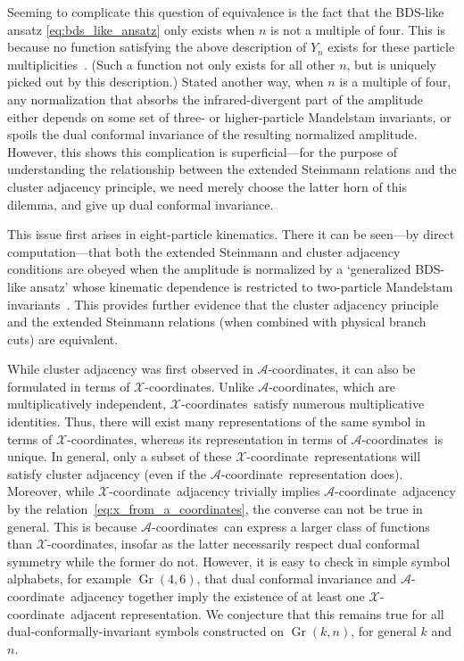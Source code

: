 \documentclass[12pt]{article}
\DeclareMathOperator{\Gr}{Gr}
\def\xcoord{$\mathcal{X}$-coordinate}
\def\xcoords{$\mathcal{X}$-coordinates}
\def\acoord{$\mathcal{A}$-coordinate}
\def\acoords{$\mathcal{A}$-coordinates}
\begin{document}
Seeming to complicate this question of equivalence is the fact that the BDS-like ansatz \eqref{eq:bds_like_ansatz} only exists when $n$ is not a multiple of four. This is because no function satisfying the above description of $Y_n$ exists for these particle multiplicities~\cite{Yang:2010az,Dixon:2016nkn}. (Such a function not only exists for all other $n$, but is uniquely picked out by this description.) Stated another way, when $n$ is a multiple of four, any normalization that absorbs the infrared-divergent part of the amplitude either depends on some set of three- or higher-particle Mandelstam invariants, or spoils the dual conformal invariance of the resulting normalized amplitude. However, this shows this complication is superficial---for the purpose of understanding the relationship between the extended Steinmann relations and the cluster adjacency principle, we need merely choose the latter horn of this dilemma, and give up dual conformal invariance. 

This issue first arises in eight-particle kinematics. There it can be seen---by direct computation---that both the extended Steinmann and cluster adjacency conditions are obeyed when the amplitude is normalized by a `generalized BDS-like ansatz' whose kinematic dependence is restricted to two-particle Mandelstam invariants~\cite{cluster_subalgebras_ii}. This provides further evidence that the cluster adjacency principle and the extended Steinmann relations (when combined with physical branch cuts) are equivalent.

While cluster adjacency was first observed in \acoords, it can also be formulated in terms of \xcoords. Unlike \acoords, which are multiplicatively independent, \xcoords\ satisfy numerous multiplicative identities. Thus, there will exist many representations of the same symbol in terms of \xcoords, whereas its representation in terms of \acoords\ is unique. In general, only a subset of these \xcoord\ representations will satisfy cluster adjacency (even if the \acoord\ representation does). Moreover, while \xcoord\ adjacency trivially implies \acoord\ adjacency by the relation~\eqref{eq:x_from_a_coordinates}, the converse can not be true in general. This is because \acoords\ can express a larger class of functions than \xcoords, insofar as the latter necessarily respect dual conformal symmetry while the former do not. However, it is easy to check in simple symbol alphabets, for example $\Gr(4,6)$, that dual conformal invariance and \acoord\ adjacency together imply the existence of at least one \xcoord\ adjacent representation. We conjecture that this remains true for all dual-conformally-invariant symbols constructed on $\Gr(k,n)$, for general $k$ and $n$. 
\end{document}
